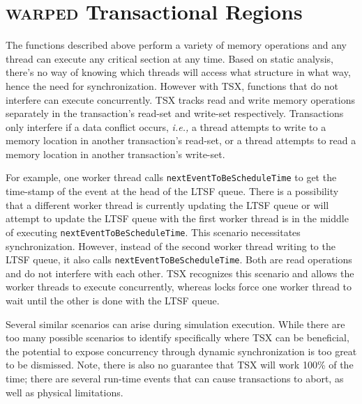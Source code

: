 \documentclass[11pt]{book}
\begin{document}
\section{\textsc{warped} Transactional Regions}

The functions described above perform a variety of memory operations and any thread can
execute any critical section at any time.  Based on static analysis, there's no way of
knowing which threads will access what structure in what way, hence the need for
synchronization.  However with TSX, functions that do not interfere can execute
concurrently.  TSX tracks read and write memory operations separately in the transaction's
read-set and write-set respectively.  Transactions only interfere if a data conflict
occurs, \emph{i.e.,} a thread attempts to write to a memory location in another
transaction's read-set, or a thread attempts to read a memory location in another
transaction's write-set.

For example, one worker thread calls \texttt{nextEventToBeScheduleTime} to get the
time-stamp of the event at the head of the LTSF queue.  There is a possibility that a
different worker thread is currently updating the LTSF queue or will attempt to update the
LTSF queue with the first worker thread is in the middle of executing
\texttt{nextEventToBeScheduleTime}.  This scenario necessitates synchronization.  However,
instead of the second worker thread writing to the LTSF queue, it also calls
\texttt{nextEventToBeScheduleTime}.  Both are read operations and do not interfere with
each other.  TSX recognizes this scenario and allows the worker threads to execute
concurrently, whereas locks force one worker thread to wait until the other is done with
the LTSF queue.

Several similar scenarios can arise during simulation execution.  While there are too many
possible scenarios to identify specifically where TSX can be beneficial, the potential to
expose concurrency through dynamic synchronization is too great to be dismissed.  Note,
there is also no guarantee that TSX will work 100\% of the time; there are several
run-time events that can cause transactions to abort, as well as physical limitations.
\end{document}
